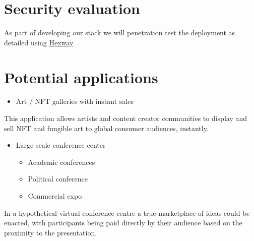 \section{Security evaluation}
As part of developing our stack we will penetration test the deployment as detailed using \href{https://hexway.io/}{Hexway}
\section{Potential applications }
\begin{itemize}
\item Art / NFT galleries with instant sales
\end{itemize}

This application allows artists and content creator communities to
display and sell NFT and fungible art to global consumer audiences,
instantly.

\begin{itemize}
\item
  Large scale conference center

  \begin{itemize}
  \item
    Academic conferences
  \item
    Political conference
  \item
    Commercial expo
  \end{itemize}
\end{itemize}

In a hypothetical virtual conference centre a true marketplace of ideas
could be enacted, with participants being paid directly by their
audience based on the proximity to the presentation.

